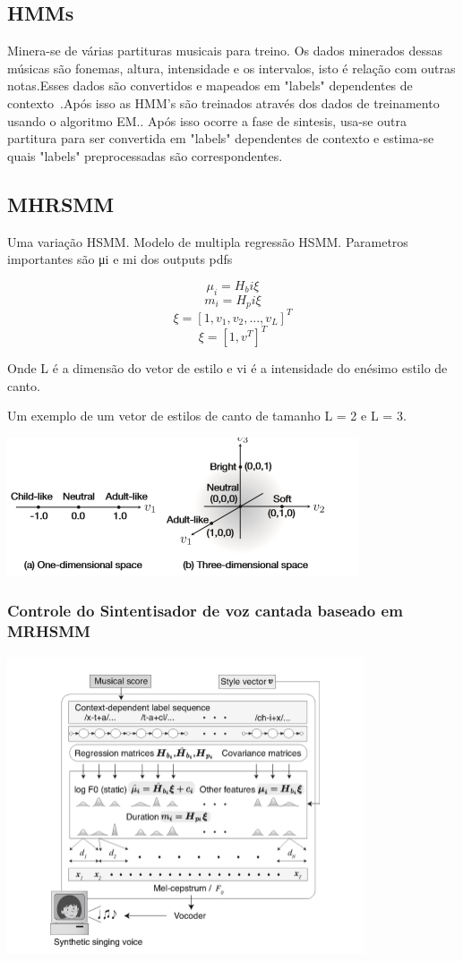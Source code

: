	
	
	
	
	\subsection{HMMs}
		Minera-se de várias partituras musicais para treino. Os dados minerados dessas músicas são fonemas, altura, intensidade e os intervalos, isto é relação com outras notas.Esses dados são convertidos e mapeados em "labels" dependentes de contexto~\cite{DegottexNada}.Após isso as HMM's são treinados através dos dados de treinamento usando o algoritmo EM.\cite{GudnasonNada}. Após isso ocorre a fase de sintesis, usa-se outra partitura para ser convertida em "labels" dependentes de contexto e estima-se quais "labels" preprocessadas são correspondentes.\cite{TakashiNose}
	
		\subsection{MHRSMM}
		Uma variação HSMM. Modelo de multipla regressão HSMM.
		Parametros importantes são μi e mi dos outputs pdfs
		
		\[ \mu_i = H_bi \xi \] 
		\[	m_i   = H_pi \xi  \]
		\[ \xi   = [1,v_1,v_2,...,v_L]^T \]	
		\[ \xi   = [1,v^T]^T	\]	
		
		Onde L é a dimensão do vetor de estilo e vi  é  a intensidade do  enésimo estilo de canto.
		
		Um exemplo de um vetor de estilos de canto de tamanho L =  2 e L = 3.
		
		\includegraphics{exemploHMM.png}
		
		\subsubsection{Controle do Sintentisador de voz cantada baseado em MRHSMM}
		
		\includegraphics{esquemaHMM.png}
		
